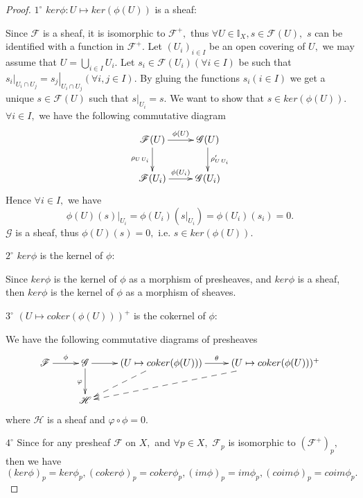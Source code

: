 \begin{proof}
$\mathit{1^{\circ}}$ $ker\phi: U\mapsto ker(\phi(U))$ is a sheaf:

Since $\mathscr{F}$ is a sheaf, it is isomorphic to $\mathscr{F}^+,$
thus $\forall U\in \mathds{I}_X, s\in \mathscr{F}(U),$ $s$ can be
identified with a function in $\mathscr{F}^+.$ Let $(U_i)_{i\in I}$
be an open covering of $U,$ we may assume that
$U=\bigcup\limits_{i\in I}U_i.$ Let $s_i\in \mathscr{F}(U_i)(\forall
i\in I)$ be such that $\left.s_i\right|_{U_i\cap U_j} =
\left.s_j\right|_{U_i\cap U_j}(\forall i,j\in I).$ By gluing the
functions $s_i(i\in I)$ we get a unique $s\in \mathscr{F}(U)$ such
that $\left.s\right|_{U_i}=s.$ We want to show that $s\in
ker(\phi(U)).$ $\forall i\in I,$ we have the following commutative
diagram
\[ \xymatrix{
   \mathscr{F}(U) \ar[r]^-{\phi(U)} \ar[d]_{\rho_{U\,U_i}} &
   \mathscr{G}(U) \ar[d]^{\rho_{U\,U_i}^{\prime}}         \\
   \mathscr{F}(U_i) \ar[r]^-{\phi(U_i)} & \mathscr{G}(U_i) }  \]
Hence $\forall i\in I,$ we have
$$\left.\phi(U)(s)\right|_{U_i} = \phi(U_i)(\left.s\right|_{U_i}) =
\phi(U_i)(s_i) = 0.$$ $\mathscr{G}$ is a sheaf, thus $\phi(U)(s)=0,$
i.e. $s\in ker(\phi(U)).$

$\mathit{2^{\circ}}$ $ker\phi$ is the kernel of $\phi:$

Since $ker\phi$ is the kernel of $\phi$ as a morphism of presheaves,
and $ker\phi$ is a sheaf, then $ker\phi$ is the kernel of $\phi$ as
a morphism of sheaves.

$\mathit{3^{\circ}}$ $(U\mapsto coker(\phi(U)))^+$ is the cokernel
of $\phi:$

We have the following commutative diagrams of presheaves
\[ \xymatrix{
   \mathscr{F} \ar[r]^-{\phi} & \mathscr{G} \ar[d]_{\varphi} \ar[r]
   & (U\mapsto coker(\phi(U))) \ar[r]^-{\theta} \ar@{-->}[dl] & (U\mapsto
   coker(\phi(U)))^+ \ar@{-->}"2,2"    \\
   & \mathscr{H} }  \]
where $\mathscr{H}$ is a sheaf and $\varphi\circ \phi=0.$

$\mathit{4^{\circ}}$ Since for any presheaf $\mathscr{F}$ on $X,$
and $\forall p\in X,$ $\mathscr{F}_p$ is isomorphic to
$(\mathscr{F}^+)_p,$ then we have $(ker\phi)_p=ker\phi_p,
(coker\phi)_p=coker\phi_p, (im\phi)_p=im\phi_p,
(coim\phi)_p=coim\phi_p.$
\end{proof}
